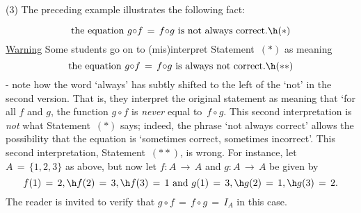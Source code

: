\V

        (3) The preceding example illustrates the following fact:

        \begin{displaymath}
        \mbox{the equation $g{\circ}f \,=\, f{\circ}g$ is not always correct.} \h ({\ast})
        \end{displaymath}
    \underline{Warning} Some students go on to (mis)interpret Statement~$({\ast})$ as meaning
        \begin{displaymath}
        \mbox{the equation $g{\circ}f \,=\, f{\circ}g$ is always not correct.} \h ({\ast}{\ast})
        \end{displaymath}
        - note how the word `always' has subtly shifted to the left of the `not' in the second version.
    That is, they interpret the original statement as meaning that `for all $f$ and $g$, the function $g{\circ}f$ is {\em never} equal to~$f{\circ}g$.
    This second interpretation is {\em not} what Statement~$({\ast})$ says; indeed, the phrase `not always correct' allows the possibility that the equation is `sometimes correct, sometimes incorrect'.
    This second interpretation, Statement~$({\ast}{\ast})$, is wrong.
    For instance, let $A \,=\, \{1,2,3\}$ as above,  but now let $f:A \,{\rightarrow}\, A$ and $g:A \,{\rightarrow}\, A$ be given by
        \begin{displaymath}
        f(1) \,=\, 2, \h f(2) \,=\, 3, \h f(3) \,=\, 1
        \mbox{ and }
        g(1) \,=\, 3, \h g(2) \,=\, 1, \h g(3) \,=\, 2.
        \end{displaymath} 
    The reader is invited to verify that $g{\circ}f \,=\, f{\circ}g \,=\, I_{A}$ in this case.

\V
\V


